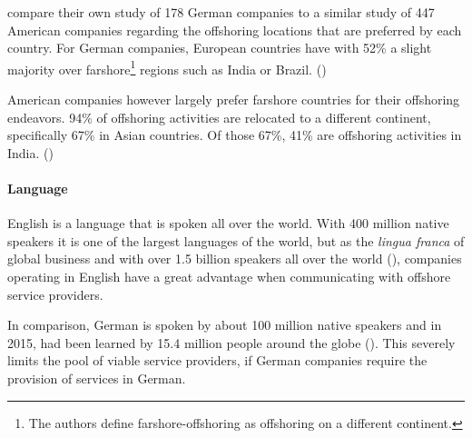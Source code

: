\cite{Hutzschenreuter.2007} compare their own study of 178 German companies to a similar study of 447 American companies regarding the offshoring locations that are preferred by each country. For German companies, European countries have with 52\% a slight majority over farshore\footnote{The authors define farshore-offshoring as offshoring on a different continent.} regions such as India or Brazil. (\cite[p. 175]{Hutzschenreuter.2007})

American companies however largely prefer farshore countries for their offshoring endeavors. 94\% of offshoring activities are relocated to a different continent, specifically 67\% in Asian countries. Of those 67\%, 41\% are offshoring activities in India. (\cite[p. 175]{Hutzschenreuter.2007})


\paragraph{Language} English is a language that is spoken all over the world. With 400 million native speakers it is one of the largest languages of the world, but as the \textit{lingua franca} of global business and with over 1.5 billion speakers all over the world (\cite[p. 1]{Hogg.2008}), companies operating in English have a great advantage when communicating with offshore service providers.

In comparison, German is spoken by about 100 million native speakers and in 2015, had been learned by 15.4 million people around the globe (\cite{AuswartigesAmt.2015}). This severely limits the pool of viable service providers, if German companies require the provision of services in German.

